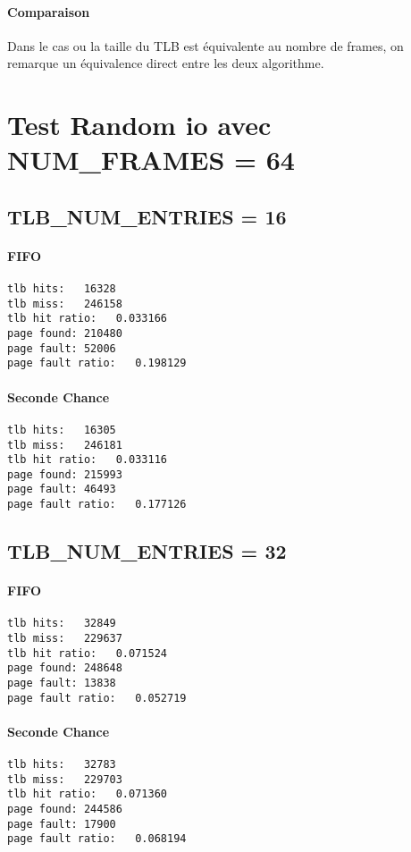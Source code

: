 \documentclass{article}
\begin{document}
\paragraph{Comparaison}
Dans le cas ou la taille du TLB est équivalente au nombre de frames,
on remarque un équivalence direct entre les deux algorithme.

\section*{Test Random io avec NUM\_FRAMES = 64}
\subsection*{TLB\_NUM\_ENTRIES = 16 }

\paragraph{FIFO}
\begin{lstlisting}
tlb hits:   16328
tlb miss:   246158
tlb hit ratio:   0.033166
page found: 210480
page fault: 52006
page fault ratio:   0.198129
\end{lstlisting}

\paragraph{Seconde Chance}
\begin{lstlisting}
tlb hits:   16305
tlb miss:   246181
tlb hit ratio:   0.033116
page found: 215993
page fault: 46493
page fault ratio:   0.177126
\end{lstlisting}

\subsection*{TLB\_NUM\_ENTRIES = 32}
\paragraph{FIFO}
\begin{lstlisting}
tlb hits:   32849
tlb miss:   229637
tlb hit ratio:   0.071524
page found: 248648
page fault: 13838
page fault ratio:   0.052719
\end{lstlisting}

\paragraph{Seconde Chance}
\begin{lstlisting}
tlb hits:   32783
tlb miss:   229703
tlb hit ratio:   0.071360
page found: 244586
page fault: 17900
page fault ratio:   0.068194
\end{lstlisting}
\end{document}
